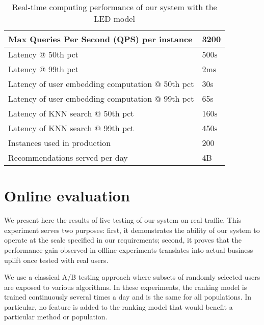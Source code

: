\documentclass[sigconf]{acmart}
\begin{document}
\begin{table}[h]
\centering
\caption{Real-time computing performance of our system with the LED model}
\begin{tabularx}{.46\textwidth}{|X|l|}
  \hline
    Max Queries Per Second (QPS) per instance & 3200 \\
  \hline
    Latency @ 50th pct & 500s \\
    Latency @ 99th pct & 2ms \\
  \hline
    Latency of user embedding computation @ 50th pct & 30s \\
    Latency of user embedding computation @ 99th pct & 65s \\
  \hline
    Latency of KNN search @ 50th pct & 160s \\
    Latency of KNN search @ 99th pct & 450s \\
  \hline
    Instances used in production & 200 \\
  \hline
    Recommendations served per day & 4B \\
  \hline
    \end{tabularx}
\label{table:system-numbers}
\end{table} 



\section{Online evaluation}
\label{sec:online-results}

We present here the results of live testing of our system on real traffic. This experiment serves two purposes: first, it demonstrates the ability of our system to operate at the scale specified in our requirements; second, it proves that the performance gain observed in offline experiments translates into actual business uplift once tested with real users.

We use a classical A/B testing approach where subsets of randomly selected users are exposed to various algorithms. In these experiments, the ranking model is trained continuously several times a day and is the same for all populations. In particular, no feature is added to the ranking model that would benefit a particular method or population.
\end{document}
